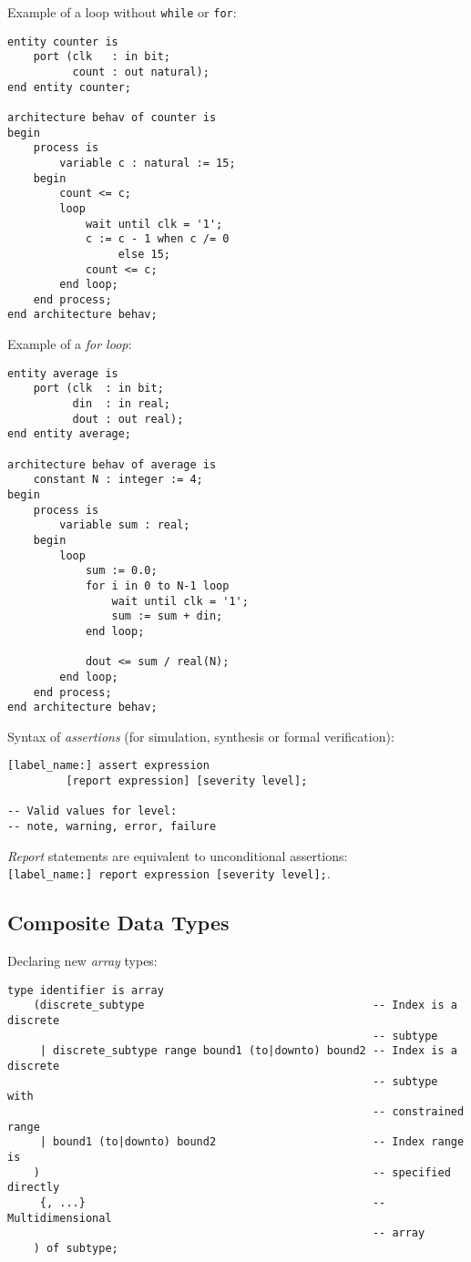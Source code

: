 \documentclass[fontsize=11pt,a4paper]{scrartcl}
\begin{document}
Example of a loop without \lstinline!while! or \lstinline!for!:
\begin{lstlisting}
entity counter is
	port (clk   : in bit;
	      count : out natural);
end entity counter;

architecture behav of counter is
begin
	process is
		variable c : natural := 15;
	begin
		count <= c;
		loop
			wait until clk = '1';
			c := c - 1 when c /= 0
			     else 15;
			count <= c;
		end loop;
	end process;
end architecture behav;
\end{lstlisting}

Example of a \emph{for loop}:
\begin{lstlisting}
entity average is
	port (clk  : in bit;
	      din  : in real;
	      dout : out real);
end entity average;

architecture behav of average is
	constant N : integer := 4;
begin
	process is
		variable sum : real;
	begin
		loop
			sum := 0.0;
			for i in 0 to N-1 loop
				wait until clk = '1';
				sum := sum + din;
			end loop;

			dout <= sum / real(N);
		end loop;
	end process;
end architecture behav;
\end{lstlisting}

Syntax of \emph{assertions} (for simulation, synthesis or formal verification):
\begin{lstlisting}
[label_name:] assert expression
         [report expression] [severity level];

-- Valid values for level:
-- note, warning, error, failure
\end{lstlisting}

\emph{Report} statements are equivalent to unconditional assertions:\\ \lstinline![label_name:] report expression [severity level];!.
%
%
%
%
\subsection{Composite Data Types}
Declaring new \emph{array} types:
\begin{lstlisting}
type identifier is array
	(discrete_subtype                                   -- Index is a discrete
	                                                    -- subtype
	 | discrete_subtype range bound1 (to|downto) bound2 -- Index is a discrete
	                                                    -- subtype with
	                                                    -- constrained range
	 | bound1 (to|downto) bound2                        -- Index range is
	)                                                   -- specified directly
	 {, ...}                                            -- Multidimensional
	                                                    -- array
	) of subtype;
\end{lstlisting}
\end{document}

